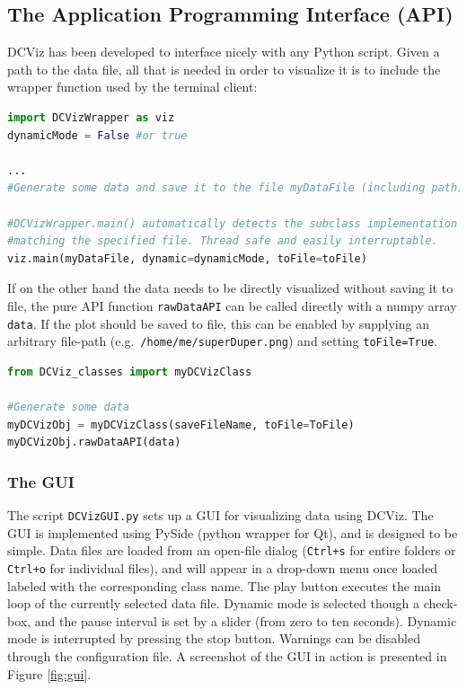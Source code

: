 \subsection{The Application Programming Interface (API)}

DCViz has been developed to interface nicely with any Python script. Given a path to the data file, all that is needed in order to visualize it is to include the wrapper function used by the terminal client:

\vspace{0.5cm}
\begin{lstlisting}[language=Python]
import DCVizWrapper as viz
dynamicMode = False #or true

...
#Generate some data and save it to the file myDataFile (including path)

#DCVizWrapper.main() automatically detects the subclass implementation 
#matching the specified file. Thread safe and easily interruptable.
viz.main(myDataFile, dynamic=dynamicMode, toFile=toFile)
\end{lstlisting}

If on the other hand the data needs to be directly visualized without saving it to file, the pure API function \verb+rawDataAPI+ can be called directly with a numpy array \verb+data+. If the plot should be saved to file, this can be enabled by supplying an arbitrary file-path (e.g.~\verb+/home/me/superDuper.png+) and setting \verb+toFile=True+.

\begin{lstlisting}[language=Python]
from DCViz_classes import myDCVizClass

#Generate some data
myDCVizObj = myDCVizClass(saveFileName, toFile=ToFile)
myDCVizObj.rawDataAPI(data)
\end{lstlisting}


\subsubsection{The GUI}

The script \verb+DCVizGUI.py+ sets up a GUI for visualizing data using DCViz. The GUI is implemented using PySide (python wrapper for Qt), and is designed to be simple. Data files are loaded from an open-file dialog (\verb|Ctrl+s| for entire folders or \verb|Ctrl+o| for individual files), and will appear in a drop-down menu once loaded labeled with the corresponding class name. The play button executes the main loop of the currently selected data file. Dynamic mode is selected though a check-box, and the pause interval is set by a slider (from zero to ten seconds). Dynamic mode is interrupted by pressing the stop button. Warnings can be disabled through the configuration file. A screenshot of the GUI in action is presented in Figure \ref{fig:gui}.

